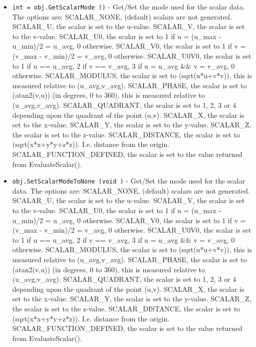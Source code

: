 \begin{itemize}
\item  \verb|int = obj.GetScalarMode ()| -  Get/Set the mode used for the scalar data.  The options are:
 SCALAR\_NONE, (default) scalars are not generated.
 SCALAR\_U, the scalar is set to the u-value. 
 SCALAR\_V, the scalar is set to the v-value.
 SCALAR\_U0, the scalar is set to 1 if u = (u\_max - u\_min)/2 = u\_avg, 0 otherwise.
 SCALAR\_V0, the scalar is set to 1 if v = (v\_max - v\_min)/2 = v\_avg, 0 otherwise.
 SCALAR\_U0V0, the scalar is 
   set to 1 if u == u\_avg, 2 if v == v\_avg, 3 if u = u\_avg \&\& v = v\_avg, 0 otherwise.
 SCALAR\_MODULUS, the scalar is set to (sqrt(u*u+v*v)), this is measured relative to (u\_avg,v\_avg).
 SCALAR\_PHASE, the scalar is set to (atan2(v,u)) (in degrees, 0 to 360), this is measured relative to (u\_avg,v\_avg).
 SCALAR\_QUADRANT, the scalar is set to 1, 2, 3 or 4 
   depending upon the quadrant of the point (u,v).
 SCALAR\_X, the scalar is set to the x-value. 
 SCALAR\_Y, the scalar is set to the y-value. 
 SCALAR\_Z, the scalar is set to the z-value. 
 SCALAR\_DISTANCE, the scalar is set to (sqrt(x*x+y*y+z*z)). I.e. distance from the origin.
 SCALAR\_FUNCTION\_DEFINED, the scalar is set to the value returned from EvaluateScalar().

\item  \verb|obj.SetScalarModeToNone (void )| -  Get/Set the mode used for the scalar data.  The options are:
 SCALAR\_NONE, (default) scalars are not generated.
 SCALAR\_U, the scalar is set to the u-value. 
 SCALAR\_V, the scalar is set to the v-value.
 SCALAR\_U0, the scalar is set to 1 if u = (u\_max - u\_min)/2 = u\_avg, 0 otherwise.
 SCALAR\_V0, the scalar is set to 1 if v = (v\_max - v\_min)/2 = v\_avg, 0 otherwise.
 SCALAR\_U0V0, the scalar is 
   set to 1 if u == u\_avg, 2 if v == v\_avg, 3 if u = u\_avg \&\& v = v\_avg, 0 otherwise.
 SCALAR\_MODULUS, the scalar is set to (sqrt(u*u+v*v)), this is measured relative to (u\_avg,v\_avg).
 SCALAR\_PHASE, the scalar is set to (atan2(v,u)) (in degrees, 0 to 360), this is measured relative to (u\_avg,v\_avg).
 SCALAR\_QUADRANT, the scalar is set to 1, 2, 3 or 4 
   depending upon the quadrant of the point (u,v).
 SCALAR\_X, the scalar is set to the x-value. 
 SCALAR\_Y, the scalar is set to the y-value. 
 SCALAR\_Z, the scalar is set to the z-value. 
 SCALAR\_DISTANCE, the scalar is set to (sqrt(x*x+y*y+z*z)). I.e. distance from the origin.
 SCALAR\_FUNCTION\_DEFINED, the scalar is set to the value returned from EvaluateScalar().


\end{itemize}
